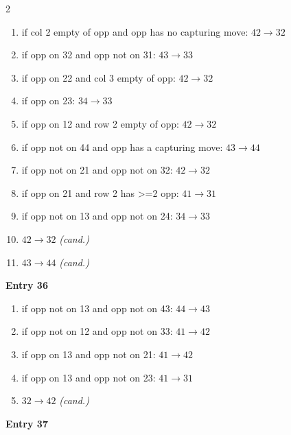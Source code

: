 \begin{multicols}{2}
\begin{tikzpicture}[scale=0.24]
\end{tikzpicture}
\nopagebreak\begin{enumerate}[topsep=1pt,itemsep=0pt,parsep=0pt,leftmargin=2.2em,label=\arabic*.]
\item if col 2 empty of opp and opp has no capturing move: $42\!\to\!32$
\item if opp on 32 and opp not on 31: $43\!\to\!33$
\item if opp on 22 and col 3 empty of opp: $42\!\to\!32$
\item if opp on 23: $34\!\to\!33$
\item if opp on 12 and row 2 empty of opp: $42\!\to\!32$
\item if opp not on 44 and opp has a capturing move: $43\!\to\!44$
\item if opp not on 21 and opp not on 32: $42\!\to\!32$
\item if opp on 21 and row 2 has >=2 opp: $41\!\to\!31$
\item if opp not on 13 and opp not on 24: $34\!\to\!33$
\item $42\!\to\!32$ \hfill\textit{(cand.)}
\item $43\!\to\!44$ \hfill\textit{(cand.)}
\end{enumerate}\smallskip
\noindent\textbf{Entry 36} \; 
\nopagebreak\begin{enumerate}[topsep=1pt,itemsep=0pt,parsep=0pt,leftmargin=2.2em,label=\arabic*.]
\item if opp not on 13 and opp not on 43: $44\!\to\!43$
\item if opp not on 12 and opp not on 33: $41\!\to\!42$
\item if opp on 13 and opp not on 21: $41\!\to\!42$
\item if opp on 13 and opp not on 23: $41\!\to\!31$
\item $32\!\to\!42$ \hfill\textit{(cand.)}
\end{enumerate}\smallskip
\noindent\textbf{Entry 37} \; 
\end{multicols}
